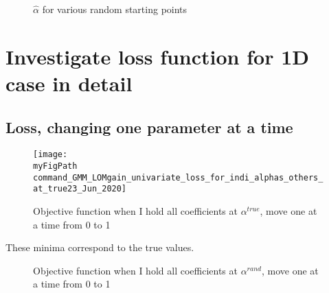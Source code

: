 \documentclass[11pt]{article}
\def \myFigPath {../../figures/}
\renewcommand{\[}{\begin{equation}}
\renewcommand{\]}{\end{equation}}
\def\mySmallFigScale{0.22}
\def\myTinyFigScale{0.16}
\begin{document}
\begin{figure}[h!]
\hfill
{}
\hfill
{}
\caption{$\hat{\alpha}$ for various random starting points}
\end{figure}


\section{Investigate loss function for 1D case in detail}
\subsection{Loss, changing one parameter at a time}
\begin{figure}[h!]
\texttt{[image: \\myFigPath command\_GMM\_LOMgain\_univariate\_loss\_for\_indi\_alphas\_others\_at\_true23\_Jun\_2020]}
\caption{Objective function when I hold all coefficients at $\alpha^{true}$, move one at a time from 0 to 1}
\end{figure}

These minima correspond to the true values. 

\begin{figure}[h!]
\hfill
{}
\caption{Objective function when I hold all coefficients at $\alpha^{rand}$, move one at a time from 0 to 1}
\end{figure}

    \clearpage
\appendix
\end{document}
